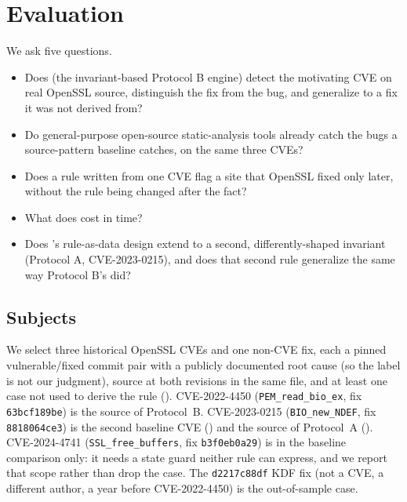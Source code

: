 \section{Evaluation}
\label{sec:eval}

We ask five questions.
\begin{itemize}
  \item[\rqref{1}] Does \tool (the invariant-based Protocol B engine) detect
    the motivating CVE on real OpenSSL source, distinguish the fix from the
    bug, and generalize to a fix it was not derived from?
  \item[\rqref{2}] Do general-purpose open-source static-analysis tools
    already catch the bugs a source-pattern baseline catches, on the same
    three CVEs?
  \item[\rqref{3}] Does a rule written from one CVE flag a site that
    OpenSSL fixed only later, without the rule being changed after the
    fact?
  \item[\rqref{4}] What does \tool cost in time?
  \item[\rqref{5}] Does \tool's rule-as-data design extend to a second,
    differently-shaped invariant (Protocol A, CVE-2023-0215), and does that
    second rule generalize the same way Protocol B's did?
\end{itemize}

\subsection{Subjects}
\label{sec:subjects}
We select three historical OpenSSL CVEs and one non-CVE fix, each a pinned
vulnerable/fixed commit pair with a publicly documented root cause (so the
label is not our judgment), source at both revisions in the same file, and
at least one case not used to derive the rule ().
CVE-2022-4450 (\texttt{PEM\_read\_bio\_ex}, fix \texttt{63bcf189be}) is the
source of Protocol~B. CVE-2023-0215 (\texttt{BIO\_new\_NDEF}, fix
\texttt{8818064ce3}) is the second baseline CVE () and the source
of Protocol~A (). CVE-2024-4741 (\texttt{SSL\_free\_buffers}, fix
\texttt{b3f0eb0a29}) is in the baseline comparison only: it needs a state
guard neither rule can express, and we report that scope rather than drop
the case. The \texttt{d2217c88df} KDF fix (not a CVE, a different author, a
year before CVE-2022-4450) is the out-of-sample case.

